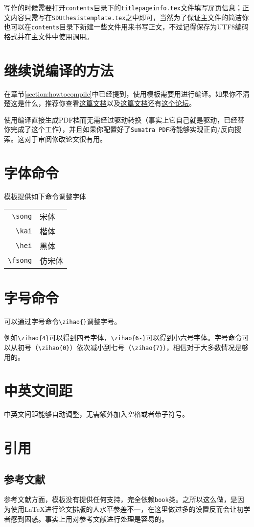 写作的时候需要打开\texttt{contents}目录下的\texttt{titlepageinfo.tex}文件填写扉页信息；正文内容只需写在\texttt{SDUthesistemplate.tex}之中即可，当然为了保证主文件的简洁你也可以在\texttt{contents}目录下新建一些文件用来书写正文，不过记得保存为UTF8编码格式并在主文件中使用\verb||调用。
\section{继续说编译的方法}
在章节\ref{section:howtocompile}中已经提到，使用模板需要用\XeLaTeX{}进行编译。如果你不清楚这是什么，推荐你查看\href{ http://blog.renren.com/blog/bp/Q74DZitxxv}{这篇文档}以及\href{http://blog.renren.com/blog/bp/Q7LjRQLBcl}{这篇文档}还有\href{http://bbs.ctex.org/forum.php}{这个论坛}。

使用\XeLaTeX{}编译直接生成PDF档而无需经过驱动转换（事实上它自己就是驱动，已经替你完成了这个工作），并且如果你配置好了\texttt{Sumatra PDF}将能够实现正向/反向搜索。这对于审阅修改论文很有用。
\section{字体命令}
模板提供如下命令调整字体
\begin{center}
\begin{tabular}
{rl}
\toprule
\verb|\song|& 宋体\\
\verb|\kai|& 楷体\\
\verb|\hei|& 黑体\\
\verb|\fsong|& 仿宋体\\
\bottomrule
\end{tabular}
\end{center}
\section{字号命令}
可以通过字号命令\verb|\zihao{}|调整字号。

例如\verb|\zihao{4}|可以得到四号字体，\verb|\zihao{6-}|可以得到小六号字体。字号命令可以从初号（\verb|\zihao{0}|）依次减小到七号（\verb|\zihao{7}|），相信对于大多数情况是够用的。
\section{中英文间距}
中英文间距能够自动调整，无需额外加入空格或者带子符号。
\section{引用}
\subsection{参考文献}
参考文献方面，模板没有提供任何支持，完全依赖\texttt{book}类。之所以这么做，是因为使用\LaTeX{}进行论文排版的人水平参差不一，在这里做过多的设置反而会让初学者感到困惑。事实上用\BibTeX{}对参考文献进行处理是容易的。
